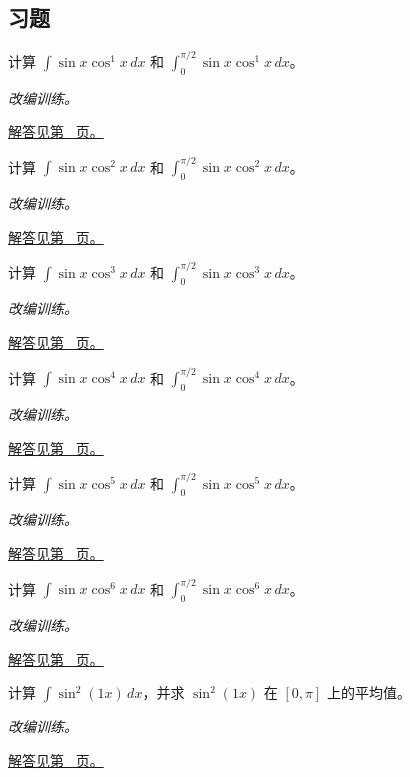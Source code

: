 \documentclass[12pt,fontset=fandol]{ctexart}
\begin{document}
\subsection{习题}
\begin{example}[正弦的一次因子]\label{ex:c14q1}
计算 $\displaystyle\int\sin x\cos^{1}x\,dx$ 和 $\displaystyle\int_0^{\pi/2}\sin x\cos^{1}x\,dx$。
\par\textit{改编训练。}\par\hyperref[ans:c14q1]{解答见第~\pageref{ans:c14q1} 页。}
\end{example}
\begin{example}[正弦的一次因子]\label{ex:c14q2}
计算 $\displaystyle\int\sin x\cos^{2}x\,dx$ 和 $\displaystyle\int_0^{\pi/2}\sin x\cos^{2}x\,dx$。
\par\textit{改编训练。}\par\hyperref[ans:c14q2]{解答见第~\pageref{ans:c14q2} 页。}
\end{example}
\begin{example}[正弦的一次因子]\label{ex:c14q3}
计算 $\displaystyle\int\sin x\cos^{3}x\,dx$ 和 $\displaystyle\int_0^{\pi/2}\sin x\cos^{3}x\,dx$。
\par\textit{改编训练。}\par\hyperref[ans:c14q3]{解答见第~\pageref{ans:c14q3} 页。}
\end{example}
\begin{example}[正弦的一次因子]\label{ex:c14q4}
计算 $\displaystyle\int\sin x\cos^{4}x\,dx$ 和 $\displaystyle\int_0^{\pi/2}\sin x\cos^{4}x\,dx$。
\par\textit{改编训练。}\par\hyperref[ans:c14q4]{解答见第~\pageref{ans:c14q4} 页。}
\end{example}
\begin{example}[正弦的一次因子]\label{ex:c14q5}
计算 $\displaystyle\int\sin x\cos^{5}x\,dx$ 和 $\displaystyle\int_0^{\pi/2}\sin x\cos^{5}x\,dx$。
\par\textit{改编训练。}\par\hyperref[ans:c14q5]{解答见第~\pageref{ans:c14q5} 页。}
\end{example}
\begin{example}[正弦的一次因子]\label{ex:c14q6}
计算 $\displaystyle\int\sin x\cos^{6}x\,dx$ 和 $\displaystyle\int_0^{\pi/2}\sin x\cos^{6}x\,dx$。
\par\textit{改编训练。}\par\hyperref[ans:c14q6]{解答见第~\pageref{ans:c14q6} 页。}
\end{example}
\begin{example}[降幂公式与平均值]\label{ex:c14q7}
计算 $\displaystyle\int\sin^2(1x)\,dx$，并求 $\sin^2(1x)$ 在 $[0,\pi]$ 上的平均值。
\par\textit{改编训练。}\par\hyperref[ans:c14q7]{解答见第~\pageref{ans:c14q7} 页。}
\end{example}
\end{document}

